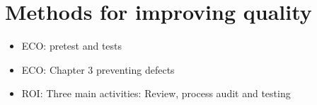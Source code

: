 
 \section{Methods for improving quality}
 
 \begin{itemize}
 
 \item ECO: pretest and tests
 
 \item ECO: Chapter 3 preventing defects 
 
 \item ROI: Three main activities: Review, process audit and testing
 
 \end{itemize}
 



 

 

